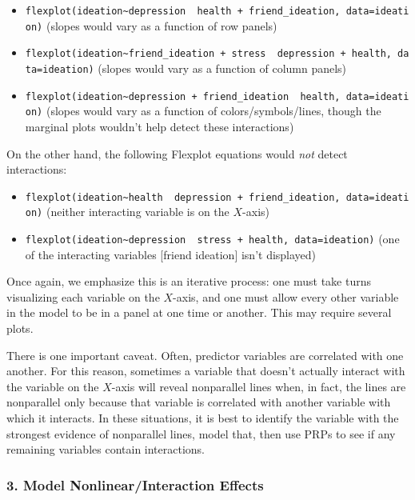 \documentclass[
  man,floatsintext]{apa6}
\providecommand{\tightlist}{%
  \setlength{\itemsep}{0pt}\setlength{\parskip}{0pt}}
\begin{document}
\begin{itemize}
\tightlist
\item
  \texttt{flexplot(ideation\textasciitilde{}depression\ \textbar{}\ health\ +\ friend\_ideation,\ data=ideation)} (slopes would vary as a function of row panels)
\item
  \texttt{flexplot(ideation\textasciitilde{}friend\_ideation\ +\ stress\ \textbar{}\ depression\ +\ health,\ data=ideation)} (slopes would vary as a function of column panels)
\item
  \texttt{flexplot(ideation\textasciitilde{}depression\ +\ friend\_ideation\ \textbar{}\ health,\ data=ideation)} (slopes would vary as a function of colors/symbols/lines, though the marginal plots wouldn't help detect these interactions)
\end{itemize}

On the other hand, the following Flexplot equations would \emph{not} detect interactions:

\begin{itemize}
\tightlist
\item
  \texttt{flexplot(ideation\textasciitilde{}health\ \textbar{}\ depression\ +\ friend\_ideation,\ data=ideation)} (neither interacting variable is on the \(X\)-axis)
\item
  \texttt{flexplot(ideation\textasciitilde{}depression\ \textbar{}\ stress\ +\ health,\ data=ideation)} (one of the interacting variables {[}friend ideation{]} isn't displayed)
\end{itemize}

Once again, we emphasize this is an iterative process: one must take turns visualizing each variable on the \(X\)-axis, and one must allow every other variable in the model to be in a panel at one time or another. This may require several plots.

There is one important caveat. Often, predictor variables are correlated with one another. For this reason, sometimes a variable that doesn't actually interact with the variable on the \(X\)-axis will reveal nonparallel lines when, in fact, the lines are nonparallel only because that variable is correlated with another variable with which it interacts. In these situations, it is best to identify the variable with the strongest evidence of nonparallel lines, model that, then use PRPs to see if any remaining variables contain interactions.

\subsubsection{3. Model Nonlinear/Interaction Effects}\label{model-nonlinearinteraction-effects}
\end{document}
